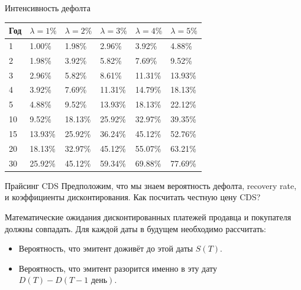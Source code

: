 \documentclass{beamer}
\begin{document}
\begin{frame}{Интенсивность дефолта}
\centering
\begin{tabular}{l|l|l|l|l|l}
Год & $\lambda=1\%$ & $\lambda=2\%$ &  $\lambda=3\%$ & $\lambda=4\%$ & $\lambda=5\%$ \\
\hline
1	& 1.00\%	& 1.98\%	& 2.96\%	& 3.92\%	& 4.88\% \\
2	& 1.98\%	& 3.92\%	& 5.82\%	& 7.69\%	& 9.52\% \\
3	& 2.96\%	& 5.82\%	& 8.61\%	& 11.31\%	& 13.93\% \\
4	& 3.92\%	& 7.69\%	& 11.31\%	& 14.79\%	& 18.13\% \\
5	& 4.88\%	& 9.52\%	& 13.93\%	& 18.13\%	& 22.12\% \\
10	& 9.52\%	& 18.13\%	& 25.92\%	& 32.97\%	& 39.35\% \\
15	& 13.93\%	& 25.92\%	& 36.24\%	& 45.12\%	& 52.76\% \\
20  & 18.13\%	& 32.97\%	& 45.12\%	& 55.07\%	& 63.21\% \\
30  & 25.92\%	& 45.12\%	& 59.34\%	& 69.88\%	& 77.69\%
\end{tabular}
\end{frame}



\begin{frame}{Прайсинг CDS}
\justify
Предположим, что мы знаем вероятность дефолта, recovery rate, и коэффициенты дисконтирования. Как посчитать честную цену CDS?

\vspace{\baselineskip}
Математические ожидания дисконтированных платежей продавца и покупателя должны совпадать. Для каждой даты в будущем необходимо рассчитать:
\begin{itemize}
\item Вероятность, что эмитент доживёт до этой даты $S(T)$.
\item Вероятность, что эмитент разорится именно в эту дату $D(T) - D(T - 1 \text{ день})$.
\end{itemize}
\end{frame}
\end{document}
